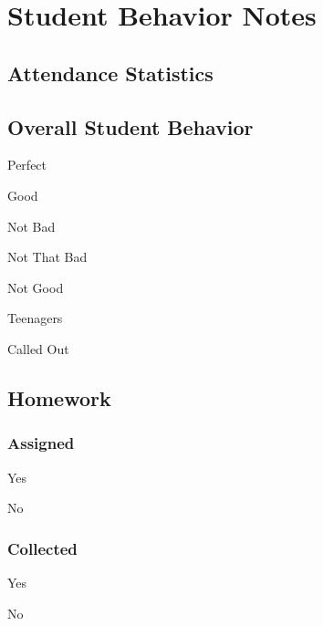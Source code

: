 \documentclass[10pt]{article}
\begin{document}
\section*{Student Behavior Notes}

\subsection*{Attendance Statistics}

\begin{description}
    \item[Number of Absentees] \uline{\hfill\null}
    \item[Students Absent] \uline{\hfill\null}
    \item \uline{\hfill\null}
    \item[Ratio \scriptsize{($absent/present$})] \uline{\hfill\null}
\end{description}

\subsection*{Overall Student Behavior}

\begin{todolist}
    \item Perfect
    \item Good
    \item Not Bad
    \item Not That Bad
    \item Not Good
    \item Teenagers
    \item Called Out
\end{todolist}

\subsection*{Homework}

\subsubsection*{Assigned}
\begin{todolist}
    \item Yes
    \item No
\end{todolist}

\subsubsection*{Collected}
\begin{todolist}
    \item Yes
    \item No
\end{todolist}
\end{document}
